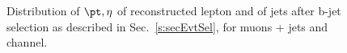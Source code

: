 \begin{figure}
    \caption{Distribution of $\pt, \eta$ of reconstructed lepton and \pt of jets
        after b-jet selection as described in Sec.~\ref{s:secEvtSel}, 
    for muons + jets and \ejets channel.}
    \label{fig:btagPlot1}
\end{figure}

